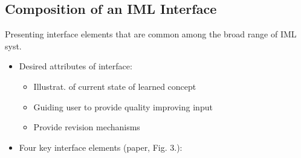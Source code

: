 \documentclass[12pt,a4paper]{article}
\begin{document}
\subsection{Composition of an IML Interface}
\begin{description}
\item Presenting interface elements that are common among the broad range of IML syst.
\end{description}
\begin{itemize}
\item Desired attributes of interface:
\begin{itemize}
\item Illustrat. of current state of learned concept
\item Guiding user to provide quality improving input
\item Provide revision mechanisms
\end{itemize}
\item Four key interface elements (paper, Fig. 3.):
\end{itemize}
\end{document}
